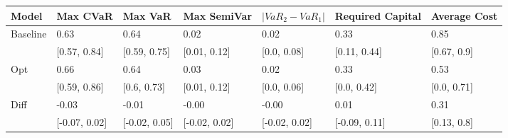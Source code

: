 \begin{tabular}{lllllll}
\toprule
   Model &      Max CVaR &       Max VaR &   Max SemiVar & $|VaR_2 - VaR_1|$ & Required Capital & Average Cost \\
\midrule
Baseline &          0.63 &          0.64 &          0.02 &              0.02 &             0.33 &         0.85 \\
         &  [0.57, 0.84] &  [0.59, 0.75] &  [0.01, 0.12] &       [0.0, 0.08] &     [0.11, 0.44] &  [0.67, 0.9] \\
     Opt &          0.66 &          0.64 &          0.03 &              0.02 &             0.33 &         0.53 \\
         &  [0.59, 0.86] &   [0.6, 0.73] &  [0.01, 0.12] &       [0.0, 0.06] &      [0.0, 0.42] &  [0.0, 0.71] \\
    Diff &         -0.03 &         -0.01 &         -0.00 &             -0.00 &             0.01 &         0.31 \\
         & [-0.07, 0.02] & [-0.02, 0.05] & [-0.02, 0.02] &     [-0.02, 0.02] &    [-0.09, 0.11] &  [0.13, 0.8] \\
\bottomrule
\end{tabular}
